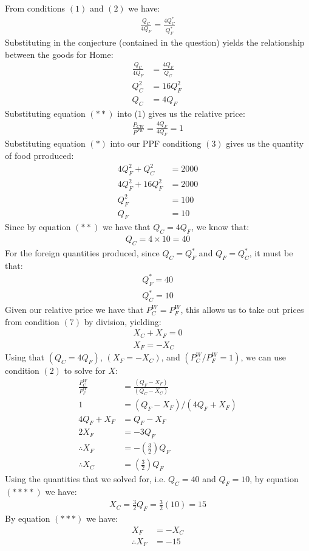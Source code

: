 \documentclass{article}
\begin{document}
From conditions $(1)$ and $(2)$ we have:
\begin{gather*}
  \tfrac{Q_{C}}{4Q_{F}} = \tfrac{4Q_{C}^{*}}{Q_{F}^{*}}
\end{gather*}
Substituting in the conjecture (contained in the question) yields the relationship between the goods for Home:
\begin{align*}
  \tfrac{Q_{C}}{4Q_{F}} &= \tfrac{4Q_{F}}{Q_{C}} \\
  Q_{C}^{2} &= 16 Q_{F}^{2} \ \tag{*} \\
  Q_{C} &= 4Q_{F} \ \tag{**}
\end{align*}
Substituting equation $(**)$ into (1) gives us the relative price:
\begin{gather*}
  \tfrac{P_{CW}}{P^{FW}} = \tfrac{4Q_{F}}{4Q_{F}} = 1
\end{gather*}
Substituting equation $(*)$ into our PPF conditiong $(3)$ gives us the quantity of food prroduced:
\begin{align*}
  4Q_{F}^{2} +  Q_{C}^{2} &= 2000 \\
  4Q_{F}^{2} + 16Q_{F}^{2} &= 2000 \\
  Q_{F}^{2} &= 100 \\
  Q_{F} &= 10
\end{align*}
Since by equation $(**)$ we have that $Q_{C} = 4Q_{F}$, we know that:
\begin{gather*}
  Q_{C} = 4 \times 10 = 40
\end{gather*}
For the foreign quantities produced, since $Q_{C} = Q_{F}^{*}$  and $Q_{F} = Q_{C}^{*}$, it must be that:
\begin{gather*}
  Q_{F}^{*} = 40 \\
  Q_{C}^{*} = 10
\end{gather*}
Given our relative price we have that $P_{C}^{W} = P_{F}^{W}$, this allows us to take out prices from condition $(7)$ by division, yielding:
\begin{gather*}
  X_{C} + X_{F} = 0 \\
  X_{F} = -X_{C} \ \tag{***}
\end{gather*}
Using that $(Q_{C} = 4Q_{F})$, $(X_{F} = -X_{C})$, and $(P_{C}^{W}/P_{F}^{W} =1)$, we can use condition $(2)$ to solve for $X$:
\begin{align*}
  \tfrac{P_{C}^{W}}{P_{F}^{W}} &= \tfrac{(Q_{F}-X_{F})}{(Q_{C}-X_{C})} \\
  1 &= (Q_{F} - X_{F})/(4Q_{F} + X_{F}) \\
  4Q_{F} + X_{F} &= Q_{F} - X_{F} \\
  2X_{F} &= -3Q_{F} \\
  \therefore X_{F} &= -(\tfrac{3}{2})Q_{F} \\
  \therefore X_{C} &= (\tfrac{3}{2})Q_{F} \ \tag{****}
\end{align*}
Using the quantities that we solved for, i.e. $Q_{C} = 40$ and $Q_{F} = 10$, by equation $(****)$ we have:
\begin{gather*}
  X_{C} = \tfrac{3}{2}Q_{F} = \tfrac{3}{2}(10) = 15
\end{gather*}
By equation $(***)$ we have:
\begin{align*}
  X_{F} &= -X_{C} \\
  \therefore X_{F} &= -15
\end{align*}
\end{document}
